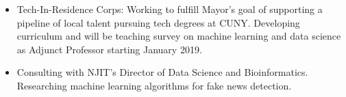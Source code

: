 \documentclass[a4paper,10pt]{memoir} %
\begin{document}
\Sep %

\begin{itemize}
	\item Tech-In-Residence Corps: Working to fulfill Mayor's goal of 
	supporting a pipeline of local talent pursuing tech degrees at CUNY. 
	Developing curriculum and will be teaching survey on machine learning 
	and data science as Adjunct Professor starting January 2019.

	\item Consulting with NJIT's Director of Data Science and 
	Bioinformatics. Researching machine learning algorithms for fake news 
	detection.
\end{itemize}

\Sep %

\end{document}
